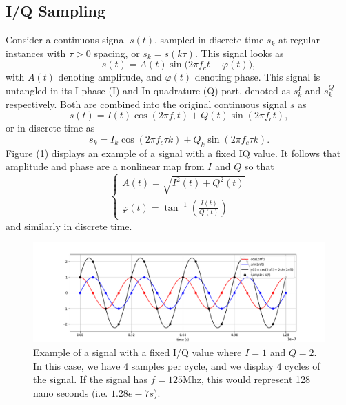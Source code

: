 \documentclass[12pt]{amsart}
\begin{document}
\subsection{I/Q Sampling}

Consider a continuous signal $s(t)$, sampled in discrete time  $s_k$ at regular instances with $\tau>0$ spacing, or $s_k = s(k\tau)$.
This signal looks as
\begin{equation}
	s(t) = A(t) \sin\big(2\pi f_c t + \varphi(t)\big),
	\label{eq.s}
\end{equation}
with $A(t)$ denoting amplitude, and $\varphi(t)$ denoting phase.
This signal is untangled in its I-phase (I) and  In-quadrature (Q) part, denoted as $s_k^I$ and $s_k^Q$ respectively.
Both are combined into the original continuous signal $s$ as
\begin{equation}
	s(t) = I(t) \cos(2\pi f_c t) +  Q(t) \sin(2\pi f_c t),
	\label{eq.siq}
\end{equation}
or in discrete time as
\begin{equation}
	s_k = I_k \cos(2\pi f_c \tau k) +  Q_k \sin(2\pi f_c \tau k).
	\label{eq.diq}
\end{equation}
Figure (\ref{fig:iq}) displays an example of a signal with a fixed IQ value.
It follows that amplitude and phase are a nonlinear map from $I$ and $Q$ so that
\begin{equation}
	\begin{cases}
		A(t) = \sqrt{I^2(t) + Q^2(t) }\\
		\varphi(t) = \tan^{-1}\left(\frac{I(t)}{Q(t)}\right)
	\end{cases}
	\label{eq.af}
\end{equation}
and similarly in discrete time.

\begin{figure}[htbp] %
   \centering
   \includegraphics[width=5in]{im/iq.png} 
   \caption{Example of a signal with a fixed I/Q value where $I=1$ and $Q=2$.
   	In this case, we have 4 samples per cycle, and we display 4 cycles of the signal.
	If the signal has $f=125$Mhz, this would represent 128 nano seconds (i.e. $1.28e-7 s$).}
   \label{fig:iq}
\end{figure}
\end{document}
